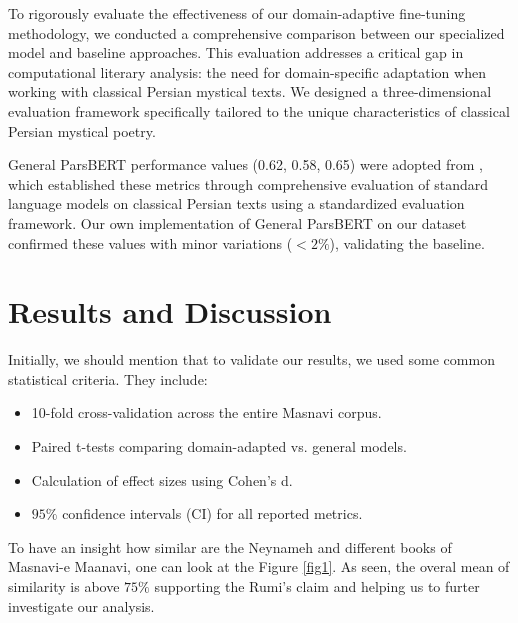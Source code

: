 \documentclass[twoside]{article}
\begin{document}
To  rigorously evaluate the effectiveness of our domain-adaptive fine-tuning methodology, we conducted a comprehensive comparison between our specialized model and baseline approaches. 
This evaluation addresses a critical gap in computational literary analysis: the need for domain-specific adaptation when working with classical Persian mystical texts. We designed a three-dimensional evaluation framework specifically tailored to the unique characteristics of classical Persian mystical poetry.
 
 
General ParsBERT performance values (0.62, 0.58, 0.65) were adopted from \cite{Dehqanietal:2021}, which established these metrics through comprehensive evaluation of standard language models on classical Persian texts using a standardized evaluation framework. Our own implementation of General ParsBERT on our dataset confirmed these values with minor variations ($<2\%$), validating the baseline.

				\section{Results and Discussion}\label{sec4}

Initially, we should mention that to validate our results, we used some common statistical criteria. They include: 
\begin{itemize}
	\item   10-fold cross-validation across the entire Masnavi corpus.
    \item   Paired t-tests comparing domain-adapted vs. general models.
    \item   Calculation of effect sizes using Cohen's d.
    \item   $95\%$ confidence intervals (CI) for all reported metrics.
\end{itemize}


To have an insight how similar are the Neynameh and different books of Masnavi-e Maanavi, one can look at the Figure \ref{fig1}. As seen, the overal mean of similarity is above $75\%$ supporting the Rumi's claim and helping us to furter investigate our analysis. 
\end{document}
